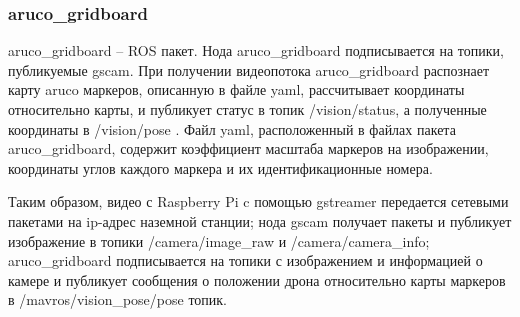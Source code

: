 \subsubsection{aruco\_gridboard}
aruco\_gridboard -- ROS пакет. Нода aruco\_gridboard подписывается на топики, публикуемые gscam. При получении видеопотока aruco\_gridboard распознает карту aruco маркеров, описанную в файле yaml, рассчитывает координаты относительно карты, и публикует статус в топик /vision/status, а полученные координаты в /vision/pose \cite{grid}. Файл yaml, расположенный в файлах пакета aruco\_gridboard, содержит коэффициент масштаба маркеров на изображении, координаты углов каждого маркера и их идентификационные номера.

Таким образом, видео с Raspberry Pi c помощью gstreamer передается сетевыми пакетами на ip-адрес наземной станции; нода gscam получает пакеты и публикует изображение в топики /camera/image\_raw и /camera/ca\-me\-ra\_info; aruco\_gridboard подписывается на топики с изображением и информацией о камере и публикует сообщения о положении дрона относительно карты маркеров в /mav\-ros/vi\-sion\_pose/pose топик.


